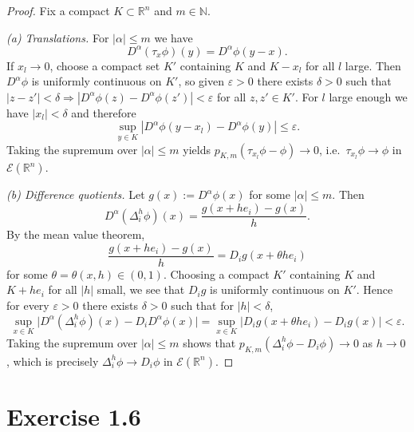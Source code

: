 \documentclass[12pt,a4paper]{article}
\theoremstyle{plain}
\theoremstyle{definition}
\theoremstyle{remark}
\theoremstyle{remark}
\begin{document}
\begin{proof}
	Fix a compact $K\subset\mathbb{R}^n$ and $m\in\mathbb{N}$.
	
	\emph{(a) Translations.}
	For $|\alpha|\le m$ we have
	\[
	D^\alpha(\tau_x\phi)(y)=D^\alpha\phi(y-x).
	\]
	If $x_l\to 0$, choose a compact set $K'$ containing $K$ and $K-x_l$ for
	all $l$ large.  Then $D^\alpha\phi$ is uniformly continuous on $K'$, so
	given $\varepsilon>0$ there exists $\delta>0$ such that
	$|z-z'|<\delta\Rightarrow |D^\alpha\phi(z)-D^\alpha\phi(z')|<\varepsilon$
	for all $z,z'\in K'$.  For $l$ large enough we have $|x_l|<\delta$ and
	therefore
	\[
	\sup_{y\in K} |D^\alpha\phi(y-x_l)-D^\alpha\phi(y)|
	\le \varepsilon.
	\]
	Taking the supremum over $|\alpha|\le m$ yields
	$p_{K,m}(\tau_{x_l}\phi-\phi)\to 0$, i.e.\ $\tau_{x_l}\phi\to\phi$ in
	$\mathcal{E}(\mathbb{R}^n)$.
	
	\medskip\noindent
	\emph{(b) Difference quotients.}
	Let $g(x) := D^\alpha\phi(x)$ for some $|\alpha|\le m$.  Then
	\[
	D^\alpha(\Delta_i^h\phi)(x)
	= \frac{g(x+he_i)-g(x)}{h}.
	\]
	By the mean value theorem,
	\[
	\frac{g(x+he_i)-g(x)}{h} = D_i g(x+\theta h e_i)
	\]
	for some $\theta=\theta(x,h)\in(0,1)$.  Choosing a compact $K'$ containing
	$K$ and $K+he_i$ for all $|h|$ small, we see that $D_i g$ is uniformly
	continuous on $K'$.  Hence for every $\varepsilon>0$ there exists
	$\delta>0$ such that for $|h|<\delta$,
	\[
	\sup_{x\in K}
	\bigl|D^\alpha(\Delta_i^h\phi)(x)-D_iD^\alpha\phi(x)\bigr|
	= \sup_{x\in K}
	|D_i g(x+\theta h e_i)-D_i g(x)|
	< \varepsilon.
	\]
	Taking the supremum over $|\alpha|\le m$ shows that
	$p_{K,m}(\Delta_i^h\phi - D_i\phi)\to 0$ as $h\to 0$, which is precisely
	$\Delta_i^h\phi\to D_i\phi$ in $\mathcal{E}(\mathbb{R}^n)$.
\end{proof}

\section*{Exercise 1.6}
\end{document}
